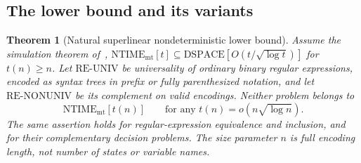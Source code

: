\documentclass[11pt]{article}
\newtheorem{theorem}{Theorem}[section]
\theoremstyle{definition}
\theoremstyle{remark}
\begin{document}
\subsection{The lower bound and its variants}

\begin{theorem}[Natural superlinear nondeterministic lower bound]
\label{thm:regex-nondet-lower}
Assume the simulation theorem of~\cite{Cruz26},
$\mathrm{NTIME}_{\mathrm{mt}}[t]\subseteq
\mathrm{DSPACE}[O(t/\sqrt{\log t})]$ for $t(n)\geq n$.
Let $\mathrm{RE\mbox{-}UNIV}$ be universality of ordinary binary
regular expressions, encoded as syntax trees in prefix or fully
parenthesized notation, and let $\mathrm{RE\mbox{-}NONUNIV}$ be its
complement on valid encodings. Neither problem belongs to
\[
 \mathrm{NTIME}_{\mathrm{mt}}[t(n)]
 \qquad\text{for any }t(n)=o(n\sqrt{\log n}).
\]
The same assertion holds for regular-expression equivalence and inclusion,
and for their complementary decision problems. The size parameter $n$
is full encoding length, not number of states or variable names.
\end{theorem}
\end{document}
